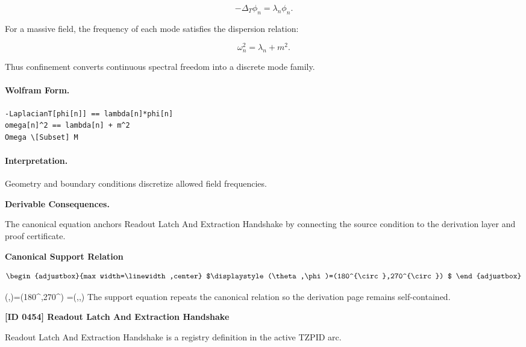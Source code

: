 \begin{equation}
-\Delta_T \phi_n = \lambda_n\phi_n .
\end{equation}

For a massive field, the frequency of each mode satisfies the dispersion relation:

\begin{equation}
\omega_n^2=\lambda_n+m^2 .
\end{equation}

Thus confinement converts continuous spectral freedom into a discrete mode family.

\paragraph{Wolfram Form.}
\begin{verbatim}
-LaplacianT[phi[n]] == lambda[n]*phi[n]
omega[n]^2 == lambda[n] + m^2
Omega \[Subset] M
\end{verbatim}

\paragraph{Interpretation.}
Geometry and boundary conditions discretize allowed field frequencies.
\endgroup

\par\vspace{0.35em}
\noindent\textbf{Derivable Consequences.}\quad
\begingroup
\footnotesize
\raggedright
The canonical equation anchors Readout Latch And Extraction Handshake by connecting the source condition to the derivation layer and proof certificate.
\par\endgroup

\noindent\textbf{Canonical Support Relation}\par
\[
\begin{adjustbox}{max width=\linewidth,center}
$\displaystyle
(\theta,\phi)=(180^{\circ},270^{\circ})
$
\end{adjustbox}
\]

\tzpequationlinks
  {(\theta,\phi)=(180^{\circ},270^{\circ})}
  {=\left(\sin\theta\cos\phi,\sin\theta\sin\phi,\cos\theta\right)}
  {\lVert{}}
\noindent The support equation repeats the canonical relation so the derivation page remains self-contained.\par

\clearpage
\noindent\textbf{[ID 0454] Readout Latch And Extraction Handshake}\par
\vspace{0.35em}
\begingroup\small
{}
Readout Latch And Extraction Handshake is a registry definition in the active TZPID arc.

